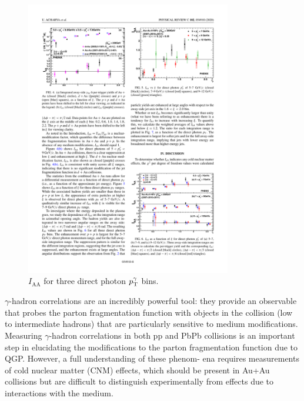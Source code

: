 \begin{figure}[htpb]
  \centering
  \includegraphics[width=0.8\textwidth]{Introduction/phenix_gh_IAA.pdf}
  \caption{$I_\mathrm{AA}$ for three direct photon $p_{\mathrm{T}}^\gamma$ bins.}
  \label{fig:phenix_gh_IAA}
\end{figure}


$\gamma$-hadron correlations are an incredibly powerful tool: they provide an observable that probes the parton fragmentation function with objects in the collision (low to intermediate \pt hadrons) that are particularly sensitive to medium modifications. Measuring $\gamma$-hadron correlations in both pp and PbPb collisions is an important step in elucidating the modifications to the parton fragmentation function due to QGP. However, a full understanding of these phenom- ena requires measurements of cold nuclear matter (CNM) effects, which should be present in Au+Au collisions but are difficult to distinguish experimentally from effects due to interactions with the medium.


